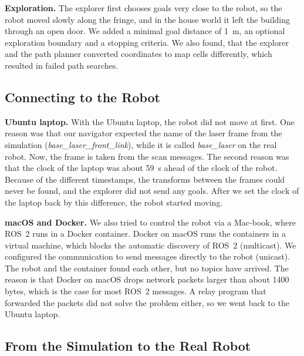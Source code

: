 \documentclass[../report.tex]{subfiles}
\begin{document}
    \textbf{Exploration.}
    The explorer first chooses goals very close to the robot, so the robot moved slowly along the fringe, and in the house world it left the building through an open door.
    We added a minimal goal distance of \SI{1}{m}, an optional exploration boundary and a stopping criteria.
    We also found, that the explorer and the path planner converted coordinates to map cells differently, which resulted in failed path searches.

    \subsection{Connecting to the Robot}
    \label{sec:challenges:connecting_to_the_robot}


    \textbf{Ubuntu laptop.}
    With the Ubuntu laptop, the robot did not move at first.
    One reason was that our navigator expected the name of the laser frame from the simulation (\emph{base\_laser\_front\_link}), while it is called \emph{base\_laser} on the real robot. Now, the frame is taken from the scan messages.
    The second reason was that the clock of the laptop was about \SI{59}{s} ahead of the clock of the robot.
    Because of the different timestamps, the transforms between the frames could never be found, and the explorer did not send any goals.
    After we set the clock of the laptop back by this difference, the robot started moving.

    \textbf{macOS and Docker.}
    We also tried to control the robot via a Mac-book, where ROS~2 runs in a Docker container.
    Docker on macOS runs the containers in a virtual machine, which blocks the automatic discovery of ROS~2 (multicast).
    We configured the communication to send messages directly to the robot (unicast). The robot and the container found each other, but no topics have arrived.
    The reason is that Docker on macOS drops network packets larger than about 1400 bytes, which is the case for most ROS~2 messages.
    A relay program that forwarded the packets did not solve the problem either, so we went back to the Ubuntu laptop.

    \subsection{From the Simulation to the Real Robot}
    \label{sec:challenges:real_robot}
\end{document}
